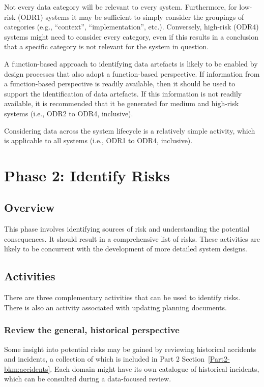 Not every data category will be relevant to every system. Furthermore, for low-risk (ODR1) systems it may be sufficient to simply consider the groupings of categories (e.g., ``context'', ``implementation'', etc.). Conversely, high-risk (ODR4) systems might need to consider every category, even if this results in a conclusion that a specific category is not relevant for the system in question.

A function-based approach to identifying \glspl{data artefact} is likely to be enabled by design processes that also adopt a function-based perspective. If \gls{information} from a function-based perspective is readily available, then it should be used to support the identification of \glspl{data artefact}. If this \gls{information} is not readily available, it is recommended that it be generated for medium and high-risk systems (i.e., ODR2 to ODR4, inclusive).

Considering data across the system lifecycle is a relatively simple activity, which is applicable to all systems (i.e., ODR1 to ODR4, inclusive).

\clearpage
\section{Phase 2: Identify Risks}
\subsection{Overview}
This phase involves identifying sources of risk and understanding the potential consequences. It should result in a comprehensive list of risks. These activities are likely to be concurrent with the development of more detailed system designs.

\subsection{Activities}
There are three complementary activities that can be used to identify risks. There is also an activity associated with updating planning documents.

\subsubsection{Review the general, historical perspective}
Some insight into potential risks may be gained by reviewing historical accidents and incidents, a collection of which is included in
Part 2 Section~\ref{Part2-bkm:accidents}. Each domain might have its own catalogue of historical incidents, which can be consulted during a data-focused review.

